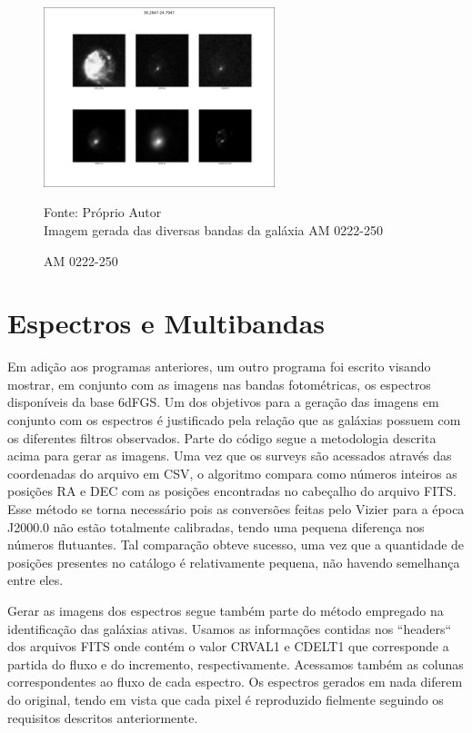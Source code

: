 \begin{figure}[H]
	\centering	
    \caption{AM 0222-250}
    \includegraphics[width=0.6\textwidth]{figuras/AM-0222-250.png}
   	\begin{center}
        \normalsize Fonte: Próprio Autor \\Imagem gerada das diversas bandas da galáxia AM 0222-250
    \end{center}
	\label{fig:fotometry_mosaic}
\end{figure}

\section{Espectros e Multibandas}
\label{subsec:spec_mult}
Em adição aos programas anteriores, um outro programa foi escrito visando mostrar, em conjunto com as imagens nas bandas fotométricas, os espectros disponíveis da base 6dFGS. Um dos objetivos para a geração das imagens em conjunto com os  espectros é justificado pela relação que as galáxias possuem com os diferentes filtros observados. Parte do código segue a metodologia descrita acima para gerar as imagens. Uma vez que os surveys são acessados através das coordenadas do arquivo em CSV, o algoritmo compara como números inteiros as posições RA e DEC com as posições encontradas no cabeçalho do arquivo FITS. Esse método se torna necessário pois as conversões feitas pelo Vizier para a época J2000.0 não estão totalmente calibradas, tendo uma pequena diferença nos números flutuantes. Tal comparação obteve sucesso, uma vez que a quantidade de posições presentes no catálogo é relativamente pequena, não havendo semelhança entre eles. 

Gerar as imagens dos espectros segue também parte do método empregado na identificação das galáxias ativas. Usamos as informações contidas nos ``headers`` dos arquivos FITS onde contém o valor CRVAL1 e CDELT1 que corresponde a  partida do fluxo e do incremento,  respectivamente. Acessamos também as colunas correspondentes  ao fluxo de cada espectro. Os espectros gerados em nada diferem do original, tendo em vista que cada pixel é reproduzido fielmente seguindo os requisitos descritos anteriormente.

